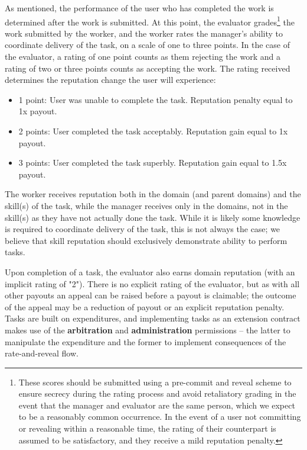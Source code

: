As mentioned, the performance of the user who has completed the work is determined after the work is submitted. At this point, the evaluator grades\footnote{These scores should be submitted using a pre-commit and reveal scheme to ensure secrecy during the rating process and avoid retaliatory grading in the event that the manager and evaluator are the same person, which we expect to be a reasonably common occurrence. In the event of a user not committing or revealing within a reasonable time, the rating of their counterpart is assumed to be satisfactory, and they receive a mild reputation penalty.} the work submitted by the worker, and the worker rates the manager's ability to coordinate delivery of the task, on a scale of one to three points. In the case of the evaluator, a rating of one point counts as them rejecting the work and a rating of two or three points counts as accepting the work. The rating received determines the reputation change the user will experience:

\begin{itemize}
 \item[]1 point:\phantom{s} User was unable to complete the task. Reputation penalty equal to 1x payout.
 \item[]2 points: User completed the task acceptably. Reputation gain equal to 1x payout.
 \item[]3 points: User completed the task superbly. Reputation gain equal to 1.5x payout.
\end{itemize}

The worker receives reputation both in the domain (and parent domains) and the skill(s) of the task, while the manager receives only in the domains, not in the skill(s) as they have not actually done the task. While it is likely some knowledge is required to coordinate delivery of the task, this is not always the case; we believe that skill reputation should exclusively demonstrate ability to perform tasks.

Upon completion of a task, the evaluator also earns domain reputation (with an implicit rating of "2"). There is no explicit rating of the evaluator, but as with all other payouts an appeal can be raised before a payout is claimable; the outcome of the appeal may be a reduction of payout or an explicit reputation penalty. \\

Tasks are built on expenditures, and implementing tasks as an extension contract makes use of the \textbf{arbitration} and \textbf{administration} permissions -- the latter to manipulate the expenditure and the former to implement consequences of the rate-and-reveal flow.

